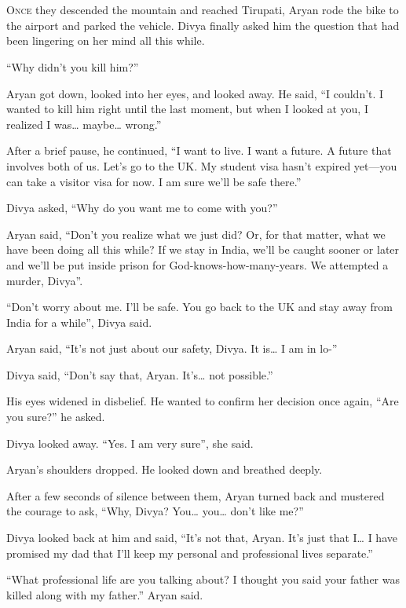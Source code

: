 \chapter{}

\lettrine{O}{nce} they descended the mountain and reached Tirupati, Aryan rode
the bike to the airport and parked the vehicle. Divya finally asked him the
question that had been lingering on her mind all this while.

“Why didn't you kill him?”

Aryan got down, looked into her eyes, and looked away. He said, “I couldn't. I
wanted to kill him right until the last moment, but when I looked at you, I
realized I was… maybe… wrong.”

After a brief pause, he continued, “I want to live. I want a future. A future
that involves both of us. Let's go to the UK. My student visa hasn't expired yet—you
can take a visitor visa for now. I am sure we'll be safe there.”

Divya asked, “Why do you want me to come with you?”

Aryan said, “Don't you realize what we just did? Or, for that matter, what we have
been doing all this while? If we stay in India, we'll be caught sooner or later
and we'll be put inside prison for God-knows-how-many-years. We attempted a
murder, Divya”.

“Don't worry about me. I'll be safe. You go back to the UK and stay away from India
for a while”, Divya said.

Aryan said, “It's not just about our safety, Divya. It is… I am in lo-”

Divya said, “Don't say that, Aryan. It's… not possible.”

His eyes widened in disbelief. He wanted to confirm her decision once again,
“Are you sure?” he asked.

Divya looked away. “Yes. I am very sure”, she said.

Aryan's shoulders dropped. He looked down and breathed deeply.

After a few seconds of silence between them, Aryan turned back and mustered the
courage to ask, “Why, Divya? You… you… don't like me?”

Divya looked back at him and said, “It's not that, Aryan. It's just that I…
I have promised my dad that I'll keep my personal and professional lives
separate.”

“What professional life are you talking about? I thought you said your father
was killed along with my father.” Aryan said.

